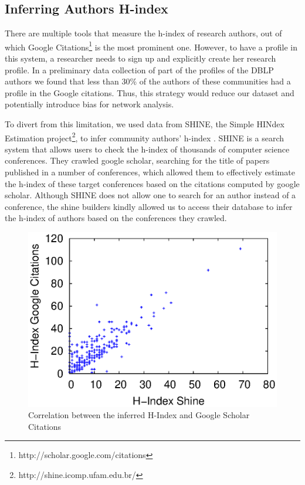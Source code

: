 \subsection{Inferring Authors H-index}
\label{sub:hindex}

There are multiple tools that measure the h-index of research authors, out of which Google Citations\footnote{http://scholar.google.com/citations} is the most prominent one.
However, to have a profile in this system, a researcher needs to sign up and explicitly create her research profile.  In a preliminary data collection of part of the profiles of
the DBLP authors we found that less than 30\% of the authors of these communities had a profile in the Google citations. Thus, this strategy would reduce our dataset and
potentially introduce bias for network analysis.
 
To divert from this limitation, we used data from SHINE, the Simple HINdex Estimation project\footnote{http://shine.icomp.ufam.edu.br/}, to infer community authors' h-index  .
SHINE is a search system that allows users to check the h-index of thousands of computer science conferences. They crawled google scholar, searching for the title of papers
published in a number of conferences, which allowed them to effectively estimate the h-index of these target conferences based on the citations computed by google scholar. Although
SHINE does not allow one to search for an author instead of a conference, the shine builders kindly allowed us to access their database to infer the h-index of authors based on the
conferences they crawled.


\begin{figure}[!htb]
\centering
\includegraphics[scale=.5]{graficos/hindex/hindex_scatter_plot.eps}
\caption{Correlation between the inferred H-Index and Google Scholar Citations }
\label{fig:hindex_scatter_plot}
\end{figure}


